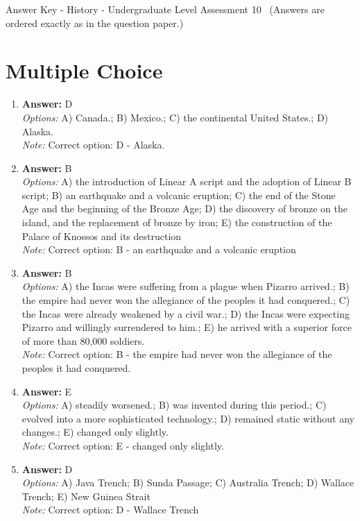 \documentclass[12pt]{article}
\begin{document}
\begin{center}
Answer Key - History - Undergraduate Level Assessment 10 \
\small (Answers are ordered exactly as in the question paper.)
\end{center}

\section*{Multiple Choice}
\begin{enumerate}[label=\arabic*.]
\item \textbf{Answer:} D
\\ \textit{Options:} A) Canada.; B) Mexico.; C) the continental United States.; D) Alaska.
\\ \textit{Note:} Correct option: D - Alaska.
\item \textbf{Answer:} B
\\ \textit{Options:} A) the introduction of Linear A script and the adoption of Linear B script; B) an earthquake and a volcanic eruption; C) the end of the Stone Age and the beginning of the Bronze Age; D) the discovery of bronze on the island, and the replacement of bronze by iron; E) the construction of the Palace of Knossos and its destruction
\\ \textit{Note:} Correct option: B - an earthquake and a volcanic eruption
\item \textbf{Answer:} B
\\ \textit{Options:} A) the Incas were suffering from a plague when Pizarro arrived.; B) the empire had never won the allegiance of the peoples it had conquered.; C) the Incas were already weakened by a civil war.; D) the Incas were expecting Pizarro and willingly surrendered to him.; E) he arrived with a superior force of more than 80,000 soldiers.
\\ \textit{Note:} Correct option: B - the empire had never won the allegiance of the peoples it had conquered.
\item \textbf{Answer:} E
\\ \textit{Options:} A) steadily worsened.; B) was invented during this period.; C) evolved into a more sophisticated technology.; D) remained static without any changes.; E) changed only slightly.
\\ \textit{Note:} Correct option: E - changed only slightly.
\item \textbf{Answer:} D
\\ \textit{Options:} A) Java Trench; B) Sunda Passage; C) Australia Trench; D) Wallace Trench; E) New Guinea Strait
\\ \textit{Note:} Correct option: D - Wallace Trench
\end{enumerate}
\end{document}
